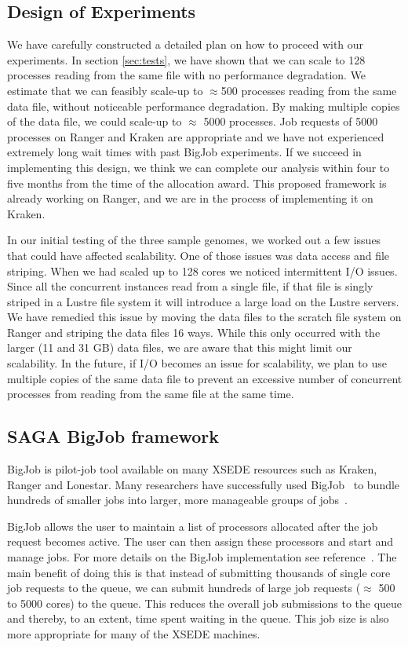 \documentclass{sig-alternate}
\begin{document}
\subsection{Design of Experiments}
We have carefully constructed a detailed plan on how to proceed with our experiments. In section \ref{sec:tests}, we have shown that we can scale to 128 processes reading from the same file with no performance degradation. We estimate that we can feasibly scale-up to $\approx$500 processes reading from the same data file, without noticeable performance degradation. By making multiple copies of the data file, we could scale-up to $\approx$ 5000 processes. Job requests of 5000 processes on Ranger and Kraken are appropriate and we have not experienced extremely long wait times with past BigJob experiments. If we succeed in implementing this design, we think we can complete our analysis within four to five months from the time of the allocation award. This proposed framework is already working on Ranger, and we are in the process of implementing it on Kraken. 

In our initial testing of the three sample genomes, we worked out a few issues that could have affected
scalability. One of those issues was data access and file striping. When we had scaled up to 128 cores we
noticed intermittent I/O issues. Since all the concurrent instances read from a single file, if that file is
singly striped in a Lustre file system it will introduce a large load on the Lustre servers. We have remedied
this issue by moving the data files to the scratch file system on Ranger and striping the data files 16
ways. While this only occurred with the larger (11 and 31 GB) data files, we are aware that this might limit
our scalability. In the future, if I/O becomes an issue for scalability, we plan to use multiple copies of the
same data file to prevent an excessive number of concurrent processes from reading from the same file at the same time.

\subsection{SAGA BigJob framework}
\label{sec:bigjob}

BigJob is pilot-job tool available on many XSEDE resources such as Kraken, Ranger and Lonestar. Many researchers have successfully used BigJob~\cite{bigjob_web} to bundle hundreds of smaller jobs into larger, more manageable groups of jobs~\cite{Luckow:2008fp, async_repex11}. 

BigJob allows the user to maintain a list of processors allocated after the job request becomes active. The user can then assign these processors and start and manage jobs. For more details on the BigJob implementation see reference~\cite{saga_bigjob_condor_cloud}. The main benefit of doing this is that instead of submitting thousands of single core job requests to the queue, we can submit hundreds of large job requests ($\approx$ 500 to 5000 cores) to the queue. This reduces the overall job submissions to the queue and thereby, to an extent, time spent waiting in the queue. This job size is also more appropriate for many of the XSEDE machines. 
\end{document}
